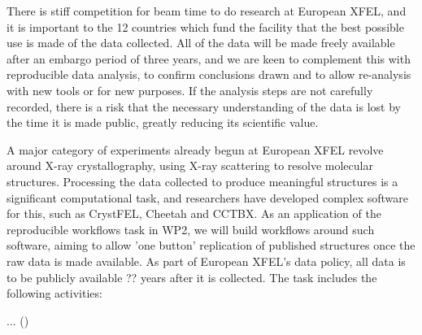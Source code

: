 \begin{task}[
  title=Reproducible X-ray crystallography workflows at European XFEL,
  id=reproducibility-euxfel,
  lead=XFEL,
  PM=36,
  wphases={0-48},
  partners={XFEL}
]
  There is stiff competition for beam time to do research at European XFEL,
  and it is important to the 12 countries 
  which fund the facility that the best possible use is made of the data collected.
  All of the data will be made freely available after an embargo period of
  three years, and we are keen to complement this with reproducible data
  analysis, to confirm conclusions drawn and to allow re-analysis with new
  tools or for new purposes.
  If the analysis steps are not carefully recorded, there is a risk that the
  necessary understanding of the data is lost by the time it is made public,
  greatly reducing its scientific value.

  A major category of experiments already begun at European XFEL revolve around
  X-ray crystallography, using X-ray scattering to resolve molecular structures.
  Processing the data collected to produce meaningful structures is a
  significant computational task, and researchers have developed complex
  software for this, such as CrystFEL, Cheetah and CCTBX.
  As an application of the reproducible workflows task in WP2, we will build
  workflows around such software, aiming to allow 'one button' replication
  of published structures once the raw data is made available.
  As part of European XFEL's data policy, all data is to be publicly available
  ?? years after it is collected.
  The task includes the following activities:
  \begin{compactitem}
  \item ...
    ()
  \end{compactitem}
\end{task}
